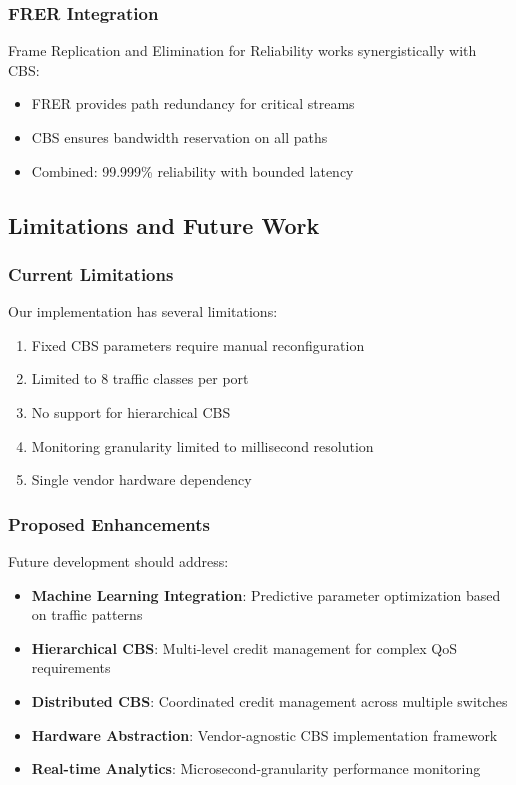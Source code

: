 \documentclass[10pt, journal, compsoc]{IEEEtran}
\begin{document}
\subsubsection{FRER Integration}

Frame Replication and Elimination for Reliability works synergistically with CBS:
\begin{itemize}
    \item FRER provides path redundancy for critical streams
    \item CBS ensures bandwidth reservation on all paths
    \item Combined: 99.999\% reliability with bounded latency
\end{itemize}

\subsection{Limitations and Future Work}

\subsubsection{Current Limitations}

Our implementation has several limitations:

\begin{enumerate}
    \item Fixed CBS parameters require manual reconfiguration
    \item Limited to 8 traffic classes per port
    \item No support for hierarchical CBS
    \item Monitoring granularity limited to millisecond resolution
    \item Single vendor hardware dependency
\end{enumerate}

\subsubsection{Proposed Enhancements}

Future development should address:

\begin{itemize}
    \item \textbf{Machine Learning Integration}: Predictive parameter optimization based on traffic patterns
    \item \textbf{Hierarchical CBS}: Multi-level credit management for complex QoS requirements
    \item \textbf{Distributed CBS}: Coordinated credit management across multiple switches
    \item \textbf{Hardware Abstraction}: Vendor-agnostic CBS implementation framework
    \item \textbf{Real-time Analytics}: Microsecond-granularity performance monitoring
\end{itemize}
\end{document}
